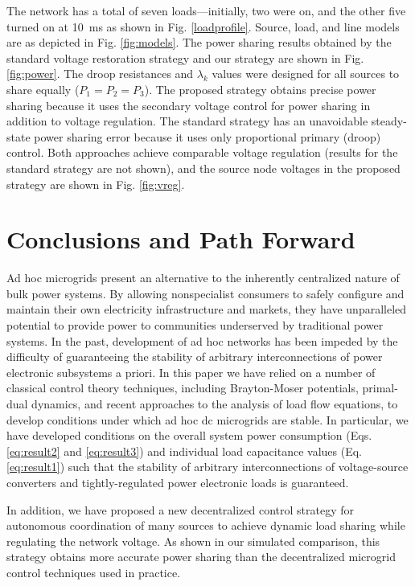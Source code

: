\documentclass[letterpaper, 10 pt, conference]{ieeeconf}
\begin{document}
The network has a total of seven loads---initially, two were on, and the other five turned on at \SI{10}{ms} as shown in Fig. \ref{loadprofile}. Source, load, and line models are as depicted in Fig. \ref{fig:models}. The power sharing results obtained by the standard voltage restoration strategy and our strategy are shown in Fig. \ref{fig:power}. The droop resistances and $\lambda_k$ values were designed for all sources to share equally ($P_1 = P_2 = P_3$). The proposed strategy obtains precise power sharing because it uses the secondary voltage control for power sharing in addition to voltage regulation. The standard strategy has an unavoidable steady-state power sharing error because it uses only proportional primary (droop) control. Both approaches achieve comparable voltage regulation (results for the standard strategy are not shown), and the source node voltages in the proposed strategy are shown in Fig. \ref{fig:vreg}.

\section{Conclusions and Path Forward}

Ad hoc microgrids present an alternative to the inherently centralized nature of bulk power systems. By allowing nonspecialist consumers to safely configure and maintain their own electricity infrastructure and markets, they have unparalleled potential to provide power to communities underserved by traditional power systems. In the past, development of ad hoc networks has been impeded by the difficulty of guaranteeing the stability of arbitrary interconnections of power electronic subsystems a priori. In this paper we have relied on a number of classical control theory techniques, including Brayton-Moser potentials, primal-dual dynamics, and recent approaches to the analysis of load flow equations, to develop conditions under which ad hoc dc microgrids are stable. In particular, we have developed conditions on the overall system power consumption (Eqs. \eqref{eq:result2} and \eqref{eq:result3}) and individual load capacitance values (Eq. \eqref{eq:result1}) such that the stability of arbitrary interconnections of voltage-source converters and tightly-regulated power electronic loads is guaranteed.

In addition, we have proposed a new decentralized control strategy for autonomous coordination of many sources to achieve dynamic load sharing while regulating the network voltage. As shown in our simulated comparison, this strategy obtains more accurate power sharing than the decentralized microgrid control techniques used in practice. 
\end{document}
